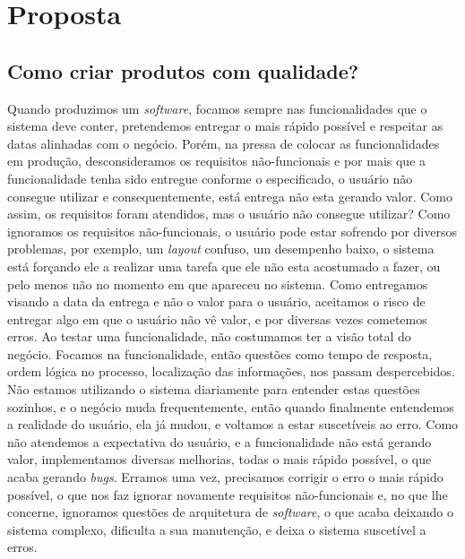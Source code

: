 \chapter{Proposta}
  \section{Como criar produtos com qualidade?}
    Quando produzimos um \textit{software}, focamos sempre nas funcionalidades que
    o sistema deve conter, pretendemos entregar o mais rápido possível e respeitar
    as datas alinhadas com o negócio. Porém, na pressa de colocar as funcionalidades
    em produção, desconsideramos os requisitos não-funcionais e por mais que a
    funcionalidade tenha sido entregue conforme o especificado, o usuário não
    consegue utilizar e consequentemente, está entrega não esta gerando valor. \newline
    Como assim, os requisitos foram atendidos, mas o usuário não consegue utilizar?
    Como ignoramos os requisitos não-funcionais, o usuário pode estar sofrendo por
    diversos problemas, por exemplo, um \textit{layout} confuso, um desempenho baixo,
    o sistema está forçando ele a realizar uma tarefa que ele não esta acostumado a
    fazer, ou pelo menos não no momento em que apareceu no sistema. Como entregamos
    visando a data da entrega e não o valor para o usuário, aceitamos o risco de
    entregar algo em que o usuário não vê valor, e por diversas vezes cometemos
    erros. Ao testar uma funcionalidade, não costumamos ter a visão total do negócio.
    Focamos na funcionalidade, então questões como tempo de resposta, ordem lógica
    no processo, localização das informações, nos passam despercebidos. Não estamos
    utilizando o sistema diariamente para entender estas questões sozinhos, e o
    negócio muda frequentemente, então quando finalmente entendemos a realidade do
    usuário, ela já mudou, e voltamos a estar suscetíveis ao erro. \newline
    Como não atendemos a expectativa do usuário, e a funcionalidade não está gerando
    valor, implementamos diversas melhorias, todas o mais rápido possível, o que
    acaba gerando \textit{bugs}. Erramos uma vez, precisamos corrigir o erro o mais
    rápido possível, o que nos faz ignorar novamente requisitos não-funcionais e,
    no que lhe concerne, ignoramos questões de arquitetura de \textit{software},
    o que acaba deixando o sistema complexo, dificulta a sua manutenção, e deixa
    o sistema suscetível a erros. \newline
